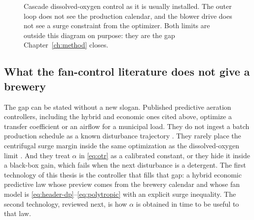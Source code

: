 \begin{figure}[ht]
\centering
{}
\caption{Cascade dissolved-oxygen control as it is usually installed. The outer loop does not see the production calendar, and the blower drive does not see a surge constraint from the optimizer. Both limits are outside this diagram on purpose: they are the gap Chapter~\ref{ch:method} closes.}
\label{fig:cascade-classical}
\end{figure}

\subsection{What the fan-control literature does not give a brewery}

The gap can be stated without a new slogan. Published predictive aeration controllers, including the hybrid and economic ones cited above, optimize a transfer coefficient or an airflow for a municipal load. They do not ingest a batch production schedule as a known disturbance trajectory \cite{harjunkoski2014,goode2013fouling,pettigrew2015cip}. They rarely place the centrifugal surge margin inside the same optimization as the dissolved-oxygen limit \cite{gravdahl1999surge,schraa2017}. And they treat $\alpha$ in \eqref{eq:otr} as a calibrated constant, or they hide it inside a black-box gain, which fails when the next disturbance is a detergent. The first technology of this thesis is the controller that fills that gap: a hybrid economic predictive law whose preview comes from the brewery calendar and whose fan model is \eqref{eq:header-dp}--\eqref{eq:polytropic} with an explicit surge inequality. The second technology, reviewed next, is how $\alpha$ is obtained in time to be useful to that law.

